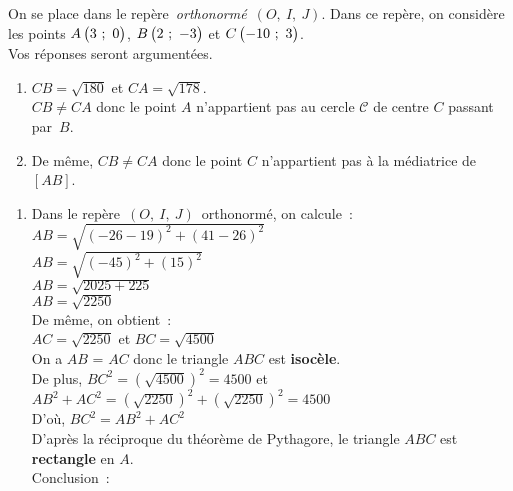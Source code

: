 \documentclass[a4paper,12pt,twocolumn,landscape]{article}
\newcommand{\rep}[3]{~$\left(#1,~#2,~#3\right)$}
\begin{document}
\begin{minipage}{0.45\textwidth}
\begin{center}
\begin{tikzpicture}[scale=0.6,every node/.style={scale=0.6}]
\end{tikzpicture}

\end{center}

\end{minipage}

\vspace*{-2em}

\newpage

\begin{minipage}{0.45\textwidth}
\thispagestyle{firststyle}

\vspace*{1em}

\exercice
On se place dans le repère~\emph{orthonormé}\rep{O}{I}{J}. Dans ce repère, on considère les points $\pointcoord{A}{3}{0}$, $\pointcoord{B}{2}{-3}$ et $\pointcoord{C}{-10}{3}$.\\Vos réponses seront argumentées.

	\begin{enumerate}
		\item $CB = \sqrt{180}$ et $CA = \sqrt{178}$.\\
				$CB \neq CA$ donc le point $A$ n'appartient pas au cercle $\mathscr{C}$ de centre $C$ passant par~$B$.
		\item De même, $CB \neq CA$ donc le point $C$ n'appartient pas à la médiatrice de $\left[AB\right]$.
	\end{enumerate}

\exercice
\begin{enumerate}
	\item Dans le repère\rep{O}{I}{J}~orthonormé, on calcule~:\\ $AB=\sqrt{\left(-26 - 19 \right) ^ 2 + \left(41 - 26 \right) ^ 2}$\\
			$AB=\sqrt{\left(-45 \right) ^ 2 + \left(15 \right) ^ 2}$\\
			$AB=\sqrt{2025 + 225}$\\
			$AB=\sqrt{2250}$\\[1em]
			De même, on obtient~:\\ $AC = \sqrt{2250}$ et $BC = \sqrt{4500}$\\[1em]
			On a $AB$ = $AC$ donc le triangle $ABC$ est \textbf{isocèle}.\\[1em]
			De plus, $BC^2 = \left(\sqrt{4500}\right)^2 = 4500$ et\\ $AB^2 + AC^2 = \left(\sqrt{2250}\right)^2 + \left(\sqrt{2250}\right)^2 = 4500$\\[1em]
			D'où, $BC^2 = AB^2 + AC^2$\\[1em]
			D'après la réciproque du théorème de Pythagore, le triangle $ABC$ est \textbf{rectangle} en $A$.\\[1em]
			Conclusion~: \\
\end{enumerate}


\end{minipage}
\end{document}
